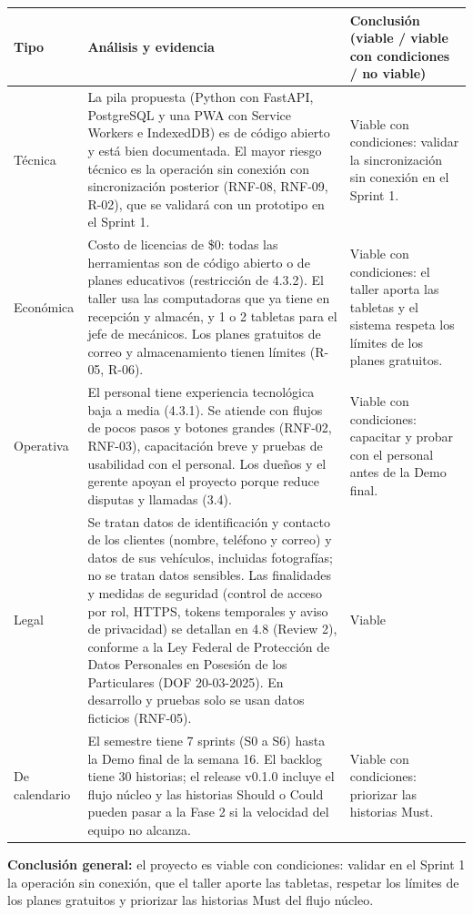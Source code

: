 {\def\LTcaptype{none} %
\begin{longtable}[]{@{}
  >{\raggedright\arraybackslash}p{}
  >{\raggedright\arraybackslash}p{}
  >{\raggedright\arraybackslash}p{}@{}}
\toprule\noalign{}
\begin{minipage}[b]{\linewidth}\raggedright
\textbf{Tipo}
\end{minipage} & \begin{minipage}[b]{\linewidth}\raggedright
\textbf{Análisis y evidencia}
\end{minipage} & \begin{minipage}[b]{\linewidth}\raggedright
\textbf{Conclusión (viable / viable con condiciones / no viable)}
\end{minipage} \\
\midrule\noalign{}
\endhead
\bottomrule\noalign{}
\endlastfoot
Técnica & La pila propuesta (Python con FastAPI, PostgreSQL y una PWA
con Service Workers e IndexedDB) es de código abierto y está bien
documentada. El mayor riesgo técnico es la operación sin conexión con
sincronización posterior (RNF-08, RNF-09, R-02), que se validará con un
prototipo en el Sprint 1. & Viable con condiciones: validar la
sincronización sin conexión en el Sprint 1. \\
Económica & Costo de licencias de \$0: todas las herramientas son de
código abierto o de planes educativos (restricción de 4.3.2). El taller usa las
computadoras que ya tiene en recepción y almacén, y 1 o 2 tabletas para
el jefe de mecánicos. Los planes gratuitos de correo y almacenamiento
tienen límites (R-05, R-06). & Viable con condiciones: el taller aporta
las tabletas y el sistema respeta los límites de los planes
gratuitos. \\
Operativa & El personal tiene experiencia tecnológica baja a media
(4.3.1). Se atiende con flujos de pocos pasos y botones grandes (RNF-02,
RNF-03), capacitación breve y pruebas de usabilidad con el personal. Los
dueños y el gerente apoyan el proyecto porque reduce disputas y llamadas
(3.4). & Viable con condiciones: capacitar y probar con el personal
antes de la Demo final. \\
Legal & Se tratan datos de identificación y contacto de los clientes
(nombre, teléfono y correo) y datos de sus vehículos, incluidas
fotografías; no se tratan datos sensibles. Las finalidades y medidas de
seguridad (control de acceso por rol, HTTPS, tokens temporales y aviso
de privacidad) se detallan en 4.8 (Review 2), conforme a la Ley Federal de Protección de
Datos Personales en Posesión de los Particulares (DOF 20-03-2025). En
desarrollo y pruebas solo se usan datos ficticios (RNF-05). & Viable \\
De calendario & El semestre tiene 7 sprints (S0 a S6) hasta la Demo
final de la semana 16. El backlog tiene 30 historias; el release v0.1.0
incluye el flujo núcleo y las historias Should o Could pueden pasar a la
Fase 2 si la velocidad del equipo no alcanza. & Viable con condiciones:
priorizar las historias Must. \\
\end{longtable}
}

\textbf{Conclusión general:} el proyecto es viable con condiciones:
validar en el Sprint 1 la operación sin conexión, que el taller aporte
las tabletas, respetar los límites de los planes gratuitos y priorizar
las historias Must del flujo núcleo.
